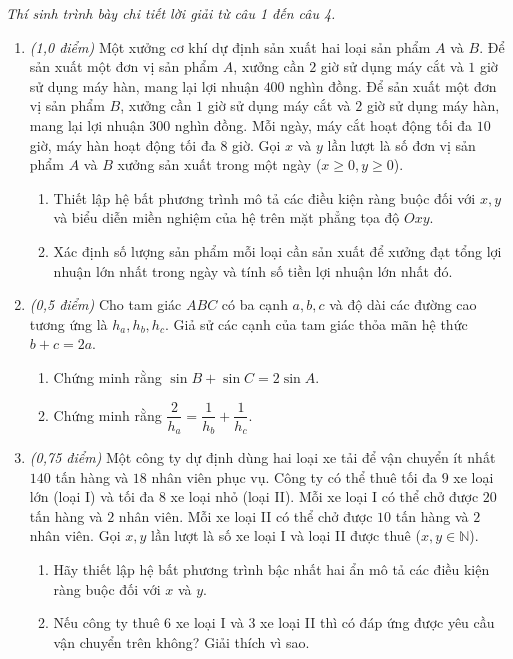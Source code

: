 \documentclass[12pt,a4paper]{article}
\newcommand{\parttitle}[1]{\par\vspace{1.5pt}{\large\bfseries\color{ink}#1}\par\vspace{0.5pt}}
\begin{document}
\parttitle{PHẦN IV. Tự luận}
\textit{Thí sinh trình bày chi tiết lời giải từ câu 1 đến câu 4.}
\begin{enumerate}
\item \textit{(1,0 điểm)} Một xưởng cơ khí dự định sản xuất hai loại sản phẩm $A$ và $B$. Để sản xuất một đơn vị sản phẩm $A$, xưởng cần $2$ giờ sử dụng máy cắt và $1$ giờ sử dụng máy hàn, mang lại lợi nhuận $400$ nghìn đồng. Để sản xuất một đơn vị sản phẩm $B$, xưởng cần $1$ giờ sử dụng máy cắt và $2$ giờ sử dụng máy hàn, mang lại lợi nhuận $300$ nghìn đồng. Mỗi ngày, máy cắt hoạt động tối đa $10$ giờ, máy hàn hoạt động tối đa $8$ giờ. Gọi $x$ và $y$ lần lượt là số đơn vị sản phẩm $A$ và $B$ xưởng sản xuất trong một ngày ($x \ge 0, y \ge 0$).
\begin{enumerate}
    \item Thiết lập hệ bất phương trình mô tả các điều kiện ràng buộc đối với $x, y$ và biểu diễn miền nghiệm của hệ trên mặt phẳng tọa độ $Oxy$.
    \item Xác định số lượng sản phẩm mỗi loại cần sản xuất để xưởng đạt tổng lợi nhuận lớn nhất trong ngày và tính số tiền lợi nhuận lớn nhất đó.
\end{enumerate}

\item \textit{(0,5 điểm)} Cho tam giác $ABC$ có ba cạnh $a, b, c$ và độ dài các đường cao tương ứng là $h_a, h_b, h_c$. Giả sử các cạnh của tam giác thỏa mãn hệ thức $b + c = 2a$.
\begin{enumerate}
    \item Chứng minh rằng $\sin B + \sin C = 2\sin A$.
    \item Chứng minh rằng $\dfrac{2}{h_a} = \dfrac{1}{h_b} + \dfrac{1}{h_c}$.
\end{enumerate}

\item \textit{(0,75 điểm)} Một công ty dự định dùng hai loại xe tải để vận chuyển ít nhất $140$ tấn hàng và $18$ nhân viên phục vụ. Công ty có thể thuê tối đa $9$ xe loại lớn (loại I) và tối đa $8$ xe loại nhỏ (loại II). Mỗi xe loại I có thể chở được $20$ tấn hàng và $2$ nhân viên. Mỗi xe loại II có thể chở được $10$ tấn hàng và $2$ nhân viên. Gọi $x, y$ lần lượt là số xe loại I và loại II được thuê ($x, y \in \mathbb{N}$).
\begin{enumerate}
    \item Hãy thiết lập hệ bất phương trình bậc nhất hai ẩn mô tả các điều kiện ràng buộc đối với $x$ và $y$.
    \item Nếu công ty thuê $6$ xe loại I và $3$ xe loại II thì có đáp ứng được yêu cầu vận chuyển trên không? Giải thích vì sao.
\end{enumerate}


\end{enumerate}
\end{document}
